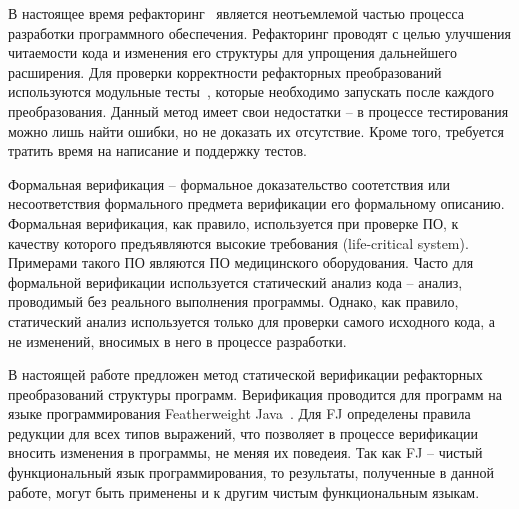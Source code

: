 \startprefacepage

В настоящее время рефакторинг~\cite{refactoring} является неотъемлемой частью процесса разработки программного обеспечения.
Рефакторинг проводят с целью улучшения читаемости кода и изменения его структуры для упрощения дальнейшего расширения.
Для проверки корректности рефакторных преобразований используются модульные тесты~\cite{tdd},
которые необходимо запускать после каждого преобразования.
Данный метод имеет свои недостатки -- в процессе тестирования можно лишь найти ошибки, но не доказать их отсутствие. 
Кроме того, требуется тратить время на написание и поддержку тестов.

Формальная верификация -- формальное доказательство соотетствия или несоответствия формального предмета верификации его формальному описанию.
Формальная верификация, как правило, используется при проверке ПО, к качеству которого предъявляются высокие требования (life-critical system).
Примерами такого ПО являются ПО медицинского оборудования.
Часто для формальной верификации используется статический анализ кода -- анализ, проводимый без реального выполнения программы.
Однако, как правило, статический анализ используется только для проверки самого исходного кода, а не изменений, вносимых в него в процессе разработки.

В настоящей работе предложен метод статической верификации рефакторных преобразований структуры программ.
Верификация проводится для программ на языке программирования Featherweight Java~\cite{fj}.
Для FJ определены правила редукции для всех типов выражений, что позволяет в процессе верификации вносить изменения в программы, не меняя их поведеия.
Так как FJ -- чистый функциональный язык программирования, то результаты, полученные в данной работе,
могут быть применены и к другим чистым функциональным языкам.